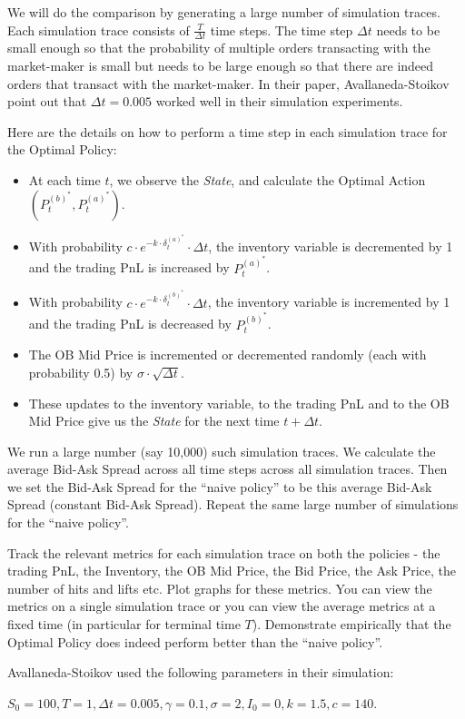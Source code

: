 \documentclass[12pt]{exam}
\begin{document}
\begin{questions}
We will do the comparison by generating a large number of simulation traces. Each simulation trace consists of $\frac T {\Delta t}$ time steps. The time step $\Delta t$ needs to be small enough so that the probability of multiple orders transacting with the market-maker is small but needs to be large enough so that there are indeed orders that transact with the market-maker. In their paper, Avallaneda-Stoikov point out that $\Delta t = 0.005$ worked well in their simulation experiments.

Here are the details on how to perform a time step in each simulation trace for the Optimal Policy:

\begin{itemize}
\item At each time $t$, we observe the {\em State}, and calculate the Optimal Action $(P_t^{(b)^*}, P_t^{(a)^*})$.
\item With probability $c \cdot e^{-k \cdot \delta_t^{(a)^*}} \cdot \Delta t$, the inventory variable is decremented by 1 and the trading PnL is increased by $P_t^{(a)^*}$.
\item With probability $c \cdot e^{-k \cdot \delta_t^{(b)^*}} \cdot \Delta t$, the inventory variable is incremented by 1 and the trading PnL is decreased by $P_t^{(b)^*}$.
\item The OB Mid Price is incremented or decremented randomly (each with probability 0.5) by $\sigma \cdot \sqrt{\Delta t}$.
\item These updates to the inventory variable, to the trading PnL and to the OB Mid Price give us the {\em State} for the next time $t + \Delta t$.
\end{itemize}

We run a large number (say 10,000) such simulation traces. We calculate the average Bid-Ask Spread across all time steps across all simulation traces. Then we set the Bid-Ask Spread for the ``naive policy'' to be this average Bid-Ask Spread (constant Bid-Ask Spread). Repeat the same large number of simulations for the ``naive policy''.

Track the relevant metrics for each simulation trace on both the policies - the trading PnL, the Inventory, the OB Mid Price, the Bid Price, the Ask Price, the number of hits and lifts etc. Plot graphs for these metrics. You can view the metrics on a single simulation trace or you can view the average metrics at a fixed time (in particular for terminal time $T$). Demonstrate empirically that the Optimal Policy does indeed perform better than the ``naive policy''. 

Avallaneda-Stoikov used the following parameters in their simulation:

$S_0 = 100, T = 1, \Delta t = 0.005, \gamma = 0.1, \sigma = 2, I_0 = 0, k = 1.5, c = 140$.

\end{questions}
\end{document}

